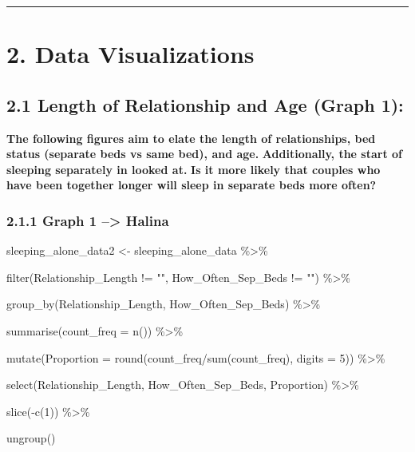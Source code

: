 \documentclass[
]{article}
\newenvironment{Shaded}{\begin{snugshade}}{\end{snugshade}}
\newcommand{\AttributeTok}[1]{\textcolor[rgb]{0.77,0.63,0.00}{#1}}
\newcommand{\DecValTok}[1]{\textcolor[rgb]{0.00,0.00,0.81}{#1}}
\newcommand{\FunctionTok}[1]{\textcolor[rgb]{0.00,0.00,0.00}{#1}}
\newcommand{\NormalTok}[1]{#1}
\newcommand{\OtherTok}[1]{\textcolor[rgb]{0.56,0.35,0.01}{#1}}
\newcommand{\SpecialCharTok}[1]{\textcolor[rgb]{0.00,0.00,0.00}{#1}}
\newcommand{\StringTok}[1]{\textcolor[rgb]{0.31,0.60,0.02}{#1}}
\begin{document}
\begin{center}\rule{0.5\linewidth}{0.5pt}\end{center}

\hypertarget{data-visualizations}{%
\section{2. Data Visualizations}\label{data-visualizations}}

\hypertarget{length-of-relationship-and-age-graph-1}{%
\subsection{2.1 Length of Relationship and Age (Graph
1):}\label{length-of-relationship-and-age-graph-1}}

\textbf{The following figures aim to elate the length of relationships,
bed status (separate beds vs same bed), and age.} \textbf{Additionally,
the start of sleeping separately in looked at.} \textbf{Is it more
likely that couples who have been together longer will sleep in separate
beds more often?}

\hypertarget{graph-1-halina}{%
\subsubsection{2.1.1 Graph 1 --\textgreater{}
Halina}\label{graph-1-halina}}

\begin{Shaded}
\begin{Highlighting}[]
\NormalTok{sleeping\_alone\_data2 }\OtherTok{\textless{}{-}}\NormalTok{ sleeping\_alone\_data }\SpecialCharTok{\%\textgreater{}\%}
  
  \FunctionTok{filter}\NormalTok{(Relationship\_Length }\SpecialCharTok{!=} \StringTok{""}\NormalTok{, How\_Often\_Sep\_Beds }\SpecialCharTok{!=} \StringTok{""}\NormalTok{) }\SpecialCharTok{\%\textgreater{}\%}
  
  \FunctionTok{group\_by}\NormalTok{(Relationship\_Length, How\_Often\_Sep\_Beds) }\SpecialCharTok{\%\textgreater{}\%}
  
  \FunctionTok{summarise}\NormalTok{(}\AttributeTok{count\_freq =} \FunctionTok{n}\NormalTok{()) }\SpecialCharTok{\%\textgreater{}\%}
  
  \FunctionTok{mutate}\NormalTok{(}\AttributeTok{Proportion =} \FunctionTok{round}\NormalTok{(count\_freq}\SpecialCharTok{/}\FunctionTok{sum}\NormalTok{(count\_freq), }\AttributeTok{digits =} \DecValTok{5}\NormalTok{)) }\SpecialCharTok{\%\textgreater{}\%}
  
  \FunctionTok{select}\NormalTok{(Relationship\_Length, How\_Often\_Sep\_Beds, Proportion) }\SpecialCharTok{\%\textgreater{}\%} 
  
  \FunctionTok{slice}\NormalTok{(}\SpecialCharTok{{-}}\FunctionTok{c}\NormalTok{(}\DecValTok{1}\NormalTok{)) }\SpecialCharTok{\%\textgreater{}\%}
  
  \FunctionTok{ungroup}\NormalTok{()}
\end{Highlighting}
\end{Shaded}
\end{document}
